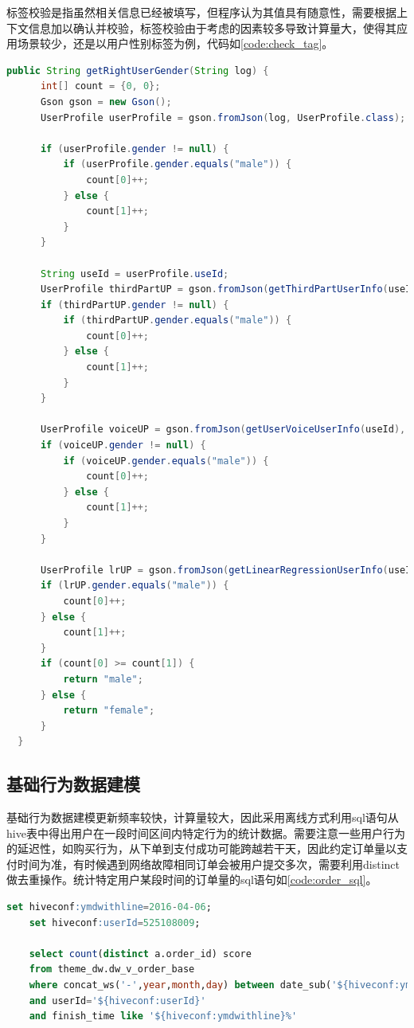   标签校验是指虽然相关信息已经被填写，但程序认为其值具有随意性，需要根据上下文信息加以确认并校验，标签校验由于考虑的因素较多导致计算量大，使得其应用场景较少，还是以用户性别标签为例，代码如\autoref{code:check_tag}。
  \begin{lstlisting}[language=java,firstnumber=1,label={code:check_tag}]
      public String getRightUserGender(String log) {
      int[] count = {0, 0};
      Gson gson = new Gson();
      UserProfile userProfile = gson.fromJson(log, UserProfile.class);

      if (userProfile.gender != null) {
          if (userProfile.gender.equals("male")) {
              count[0]++;
          } else {
              count[1]++;
          }
      }

      String useId = userProfile.useId;
      UserProfile thirdPartUP = gson.fromJson(getThirdPartUserInfo(useId), UserProfile.class);
      if (thirdPartUP.gender != null) {
          if (thirdPartUP.gender.equals("male")) {
              count[0]++;
          } else {
              count[1]++;
          }
      }

      UserProfile voiceUP = gson.fromJson(getUserVoiceUserInfo(useId), UserProfile.class);
      if (voiceUP.gender != null) {
          if (voiceUP.gender.equals("male")) {
              count[0]++;
          } else {
              count[1]++;
          }
      }

      UserProfile lrUP = gson.fromJson(getLinearRegressionUserInfo(useId), UserProfile.class);
      if (lrUP.gender.equals("male")) {
          count[0]++;
      } else {
          count[1]++;
      }
      if (count[0] >= count[1]) {
          return "male";
      } else {
          return "female";
      }
  }
  \end{lstlisting}

  \subsection{基础行为数据建模}
  基础行为数据建模更新频率较快，计算量较大，因此采用离线方式利用sql语句从hive表中得出用户在一段时间区间内特定行为的统计数据。需要注意一些用户行为的延迟性，如购买行为，从下单到支付成功可能跨越若干天，因此约定订单量以支付时间为准，有时候遇到网络故障相同订单会被用户提交多次，需要利用distinct做去重操作。统计特定用户某段时间的订单量的sql语句如\autoref{code:order_sql}。
  \begin{lstlisting}[language=SQL,firstnumber=1,label={code:order_sql}]
    set hiveconf:ymdwithline=2016-04-06;
    set hiveconf:userId=525108009;

    select count(distinct a.order_id) score
    from theme_dw.dw_v_order_base
    where concat_ws('-',year,month,day) between date_sub('${hiveconf:ymdwithline}',5) and '${hiveconf:ymdwithline}'
    and userId='${hiveconf:userId}'
    and finish_time like '${hiveconf:ymdwithline}%'
  \end{lstlisting}

